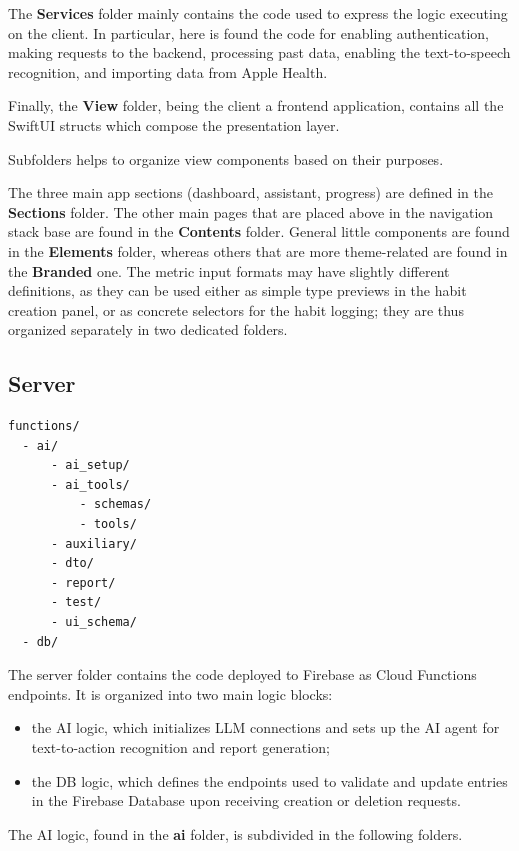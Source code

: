 \documentclass{article}
\newcommand{\newpar}[0]{\vspace{2mm}\noindent}
\begin{document}
\newpar
The \textbf{Services} folder mainly contains the code used to express the logic executing on the client.
In particular, here is found the code for enabling authentication, making requests to the backend, processing past data, enabling the text-to-speech recognition, and importing data from Apple Health.

\newpar
Finally, the \textbf{View} folder, being the client a frontend application, contains all the SwiftUI structs which compose the presentation layer.

Subfolders helps to organize view components based on their purposes.

The three main app sections (dashboard, assistant, progress) are defined in the \textbf{Sections} folder.
The other main pages that are placed above in the navigation stack base are found in the \textbf{Contents} folder.
General little components are found in the \textbf{Elements} folder, whereas others that are more theme-related are found in the \textbf{Branded} one.
The metric input formats may have slightly different definitions, as they can be used either as simple type previews in the habit creation panel, or as concrete selectors for the habit logging; they are thus organized separately in two dedicated folders.

\subsection{Server}

\begin{verbatim}
functions/
  - ai/
      - ai_setup/
      - ai_tools/
          - schemas/
          - tools/
      - auxiliary/
      - dto/
      - report/
      - test/
      - ui_schema/
  - db/
\end{verbatim}

\newpar
The server folder contains the code deployed to Firebase as Cloud Functions endpoints.
It is organized into two main logic blocks:

\begin{itemize}
	\item the AI logic, which initializes LLM connections and sets up the AI agent for text-to-action recognition and report generation;
	\item the DB logic, which defines the endpoints used to validate and update entries in the Firebase Database upon receiving creation or deletion requests.
\end{itemize}

\newpar
The AI logic, found in the \textbf{ai} folder, is subdivided in the following folders.
\end{document}
